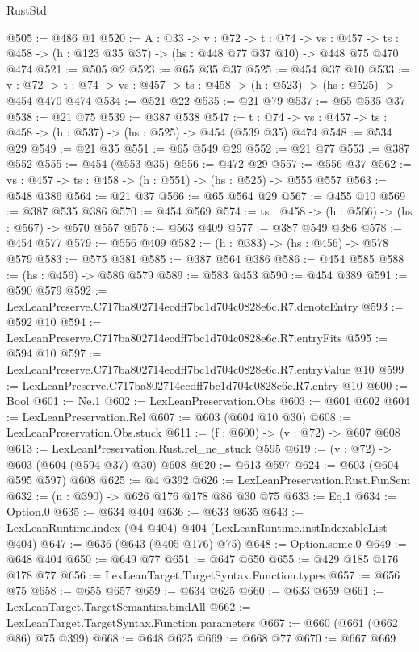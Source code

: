 \begin{lexlean}{RustStd}
\begin{coremodule}
@505 := @486 @1
@520 := {A : @33} ->
  {v : @72} ->
  {t : @74} ->
  {vs : @457} -> {ts : @458} -> (h : @123 @35 @37) -> (hs : @448 @77 @37 @10) -> @448 @75 @470 @474
@521 := @505 @2
@523 := @65 @35 @37
@525 := @454 @37 @10
@533 := {v : @72} ->
  {t : @74} -> {vs : @457} -> {ts : @458} -> (h : @523) -> (hs : @525) -> @454 @470 @474
@534 := @521 @22
@535 := @21 @79
@537 := @65 @535 @37
@538 := @21 @75
@539 := @387 @538
@547 := {t : @74} -> {vs : @457} -> {ts : @458} -> (h : @537) -> (hs : @525) -> @454 (@539 @35) @474
@548 := @534 @29
@549 := @21 @35
@551 := @65 @549 @29
@552 := @21 @77
@553 := @387 @552
@555 := @454 (@553 @35)
@556 := @472 @29
@557 := @556 @37
@562 := {vs : @457} -> {ts : @458} -> (h : @551) -> (hs : @525) -> @555 @557
@563 := @548 @386
@564 := @21 @37
@566 := @65 @564 @29
@567 := @455 @10
@569 := @387 @535 @386
@570 := @454 @569
@574 := {ts : @458} -> (h : @566) -> (hs : @567) -> @570 @557
@575 := @563 @409
@577 := @387 @549 @386
@578 := @454 @577
@579 := @556 @409
@582 := (h : @383) -> (hs : @456) -> @578 @579
@583 := @575 @381
@585 := @387 @564 @386
@586 := @454 @585
@588 := (hs : @456) -> @586 @579
@589 := @583 @453
@590 := @454 @389
@591 := @590 @579
@592 := LexLeanPreserve.C717ba802714ecdff7bc1d704c0828e6c.R7.denoteEntry
@593 := @592 @10
@594 := LexLeanPreserve.C717ba802714ecdff7bc1d704c0828e6c.R7.entryFits
@595 := @594 @10
@597 := LexLeanPreserve.C717ba802714ecdff7bc1d704c0828e6c.R7.entryValue @10
@599 := LexLeanPreserve.C717ba802714ecdff7bc1d704c0828e6c.R7.entry @10
@600 := Bool
@601 := Ne.{1}
@602 := LexLeanPreservation.Obs
@603 := @601 @602
@604 := LexLeanPreservation.Rel
@607 := @603 (@604 @10 @30)
@608 := LexLeanPreservation.Obs.stuck
@611 := (f : @600) -> (v : @72) -> @607 @608
@613 := LexLeanPreservation.Rust.rel_ne_stuck @595
@619 := (v : @72) -> @603 (@604 (@594 @37) @30) @608
@620 := @613 @597
@624 := @603 (@604 @595 @597) @608
@625 := @4 @392
@626 := LexLeanPreservation.Rust.FunSem
@632 := (n : @390) -> @626 @176 @178 @86 @30 @75
@633 := Eq.{1}
@634 := Option.{0}
@635 := @634 @404
@636 := @633 @635
@643 := LexLeanRuntime.index (@4 @404) @404 (LexLeanRuntime.instIndexableList @404)
@647 := @636 (@643 (@405 @176) @75)
@648 := Option.some.{0}
@649 := @648 @404
@650 := @649 @77
@651 := @647 @650
@655 := @429 @185 @176 @178 @77
@656 := LexLeanTarget.TargetSyntax.Function.types
@657 := @656 @75
@658 := @655 @657
@659 := @634 @625
@660 := @633 @659
@661 := LexLeanTarget.TargetSemantics.bindAll
@662 := LexLeanTarget.TargetSyntax.Function.parameters
@667 := @660 (@661 (@662 @86) @75 @399)
@668 := @648 @625
@669 := @668 @77
@670 := @667 @669

\end{coremodule}
\end{lexlean}
